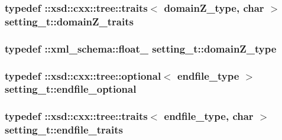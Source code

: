 \subsubsection[{\texorpdfstring{domain\+Z\+\_\+traits}{domainZ_traits}}]{\setlength{\rightskip}{0pt plus 5cm}typedef \+::xsd\+::cxx\+::tree\+::traits$<$ {\bf domain\+Z\+\_\+type}, char $>$ {\bf setting\+\_\+t\+::domain\+Z\+\_\+traits}}\hypertarget{classsetting__t_a9247da64df3be9ea926998c19eb16349}{}\label{classsetting__t_a9247da64df3be9ea926998c19eb16349}
\subsubsection[{\texorpdfstring{domain\+Z\+\_\+type}{domainZ_type}}]{\setlength{\rightskip}{0pt plus 5cm}typedef \+::{\bf xml\+\_\+schema\+::float\+\_\+} {\bf setting\+\_\+t\+::domain\+Z\+\_\+type}}\hypertarget{classsetting__t_a2257367cc1475e2a9b1b2a82dbdaddaf}{}\label{classsetting__t_a2257367cc1475e2a9b1b2a82dbdaddaf}
\subsubsection[{\texorpdfstring{endfile\+\_\+optional}{endfile_optional}}]{\setlength{\rightskip}{0pt plus 5cm}typedef \+::xsd\+::cxx\+::tree\+::optional$<$ {\bf endfile\+\_\+type} $>$ {\bf setting\+\_\+t\+::endfile\+\_\+optional}}\hypertarget{classsetting__t_a38dbb691ee80d982dc24fd1b3e514f1e}{}\label{classsetting__t_a38dbb691ee80d982dc24fd1b3e514f1e}
\subsubsection[{\texorpdfstring{endfile\+\_\+traits}{endfile_traits}}]{\setlength{\rightskip}{0pt plus 5cm}typedef \+::xsd\+::cxx\+::tree\+::traits$<$ {\bf endfile\+\_\+type}, char $>$ {\bf setting\+\_\+t\+::endfile\+\_\+traits}}\hypertarget{classsetting__t_a0c2240e9363329e936e3ba35fa9ec642}{}\label{classsetting__t_a0c2240e9363329e936e3ba35fa9ec642}
